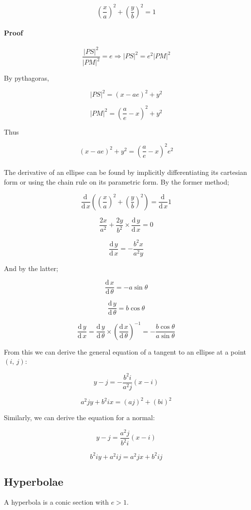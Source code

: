 \documentclass{article}
\newcommand{\de}{\textrm{d}\,}
\begin{document}
\[\left(\frac{x}{a}\right)^2 + \left(\frac{y}{b}\right)^2 = 1\]

\paragraph{Proof} 

\[\frac{|PS|^2}{|PM|^2} = e \Rightarrow |PS|^2 = e^2|PM|^2\]

\noindent By pythagoras,

\[|PS|^2 = \left(x - ae\right)^2 + y^2\]

\[|PM|^2 = \left(\frac{a}{e} - x\right)^2 + y^2\]

\noindent Thus

\[\left(x - ae\right)^2 + y^2 = \left(\frac{a}{e} - x\right)^2e^2\]\\

\noindent The derivative of an ellipse can be found by implicitly
differentiating its cartesian form or using the chain rule on its parametric
form. By the former method;

\[\frac{\de}{\de x} \left(\left(\frac{x}{a}\right)^2 +
\left(\frac{y}{b}\right)^2\right) = \frac{\de}{\de x}1\]

\[\frac{2x}{a^2} + \frac{2y}{b^2} \times \frac{\de y}{\de x} = 0\]

\[\frac{\de y}{\de x} = -\frac{b^2x}{a^2y}\]

\noindent And by the latter;

\[\frac{\de x}{\de \theta} = -a\sin\theta\]

\[\frac{\de y}{\de \theta} = b\cos\theta\]

\[\frac{\de y}{\de x} = \frac{\de y}{\de \theta} \times \left(\frac{\de x}{\de
\theta}\right)^{-1} = -\frac{b\cos\theta}{a\sin\theta}\]

\noindent From this we can derive the general equation of a tangent to an
ellipse at a point $\left(i,\, j\right)$:

\[y - j = -\frac{b^2i}{a^2j}\left(x - i\right)\]

\[a^2jy + b^2ix = \left(aj\right)^2 + \left(bi\right)^2\]

\noindent Similarly, we can derive the equation for a normal:

\[y - j = \frac{a^2j}{b^2i}\left(x - i\right)\]

\[b^2iy + a^2ij = a^2jx + b^2ij\]

\subsection{Hyperbolae}

A hyperbola is a conic section with $e > 1$.
\end{document}
